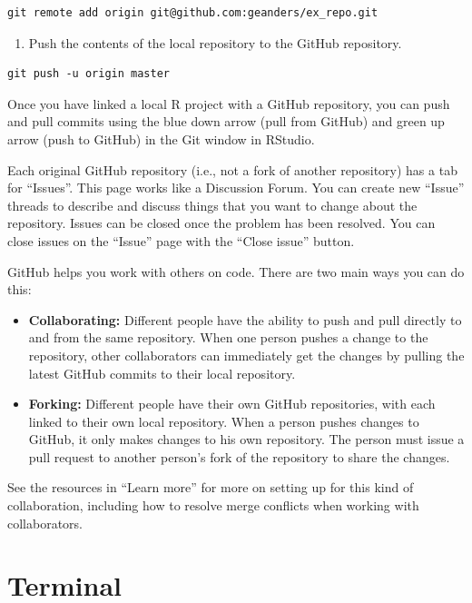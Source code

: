 \documentclass[]{tufte-book}
\providecommand{\tightlist}{%
  \setlength{\itemsep}{0pt}\setlength{\parskip}{0pt}}
\begin{document}
\begin{verbatim}
git remote add origin git@github.com:geanders/ex_repo.git
\end{verbatim}

\begin{enumerate}
\def\labelenumi{\arabic{enumi}.}
\setcounter{enumi}{2}
\tightlist
\item
  Push the contents of the local repository to the GitHub repository.
\end{enumerate}

\begin{verbatim}
git push -u origin master
\end{verbatim}

Once you have linked a local R project with a GitHub repository, you can push
and pull commits using the blue down arrow (pull from GitHub) and green up arrow
(push to GitHub) in the Git window in RStudio.

Each original GitHub repository (i.e., not a fork of another repository) has a
tab for ``Issues''. This page works like a Discussion Forum. You can create new
``Issue'' threads to describe and discuss things that you want to change about the
repository. Issues can be closed once the problem has been resolved. You can
close issues on the ``Issue'' page with the ``Close issue'' button.

GitHub helps you work with others on code. There are two main ways you can do this:

\begin{itemize}
\tightlist
\item
  \textbf{Collaborating:} Different people have the ability to push and pull directly
  to and from the same repository. When one person pushes a change to the
  repository, other collaborators can immediately get the changes by pulling the
  latest GitHub commits to their local repository.
\item
  \textbf{Forking:} Different people have their own GitHub repositories, with each
  linked to their own local repository. When a person pushes changes to GitHub, it
  only makes changes to his own repository. The person must issue a pull request
  to another person's fork of the repository to share the changes.
\end{itemize}

See the resources in ``Learn more'' for more on setting up for this kind of collaboration,
including how to resolve merge conflicts when working with collaborators.

\hypertarget{terminal}{%
\section{Terminal}\label{terminal}}
\end{document}
